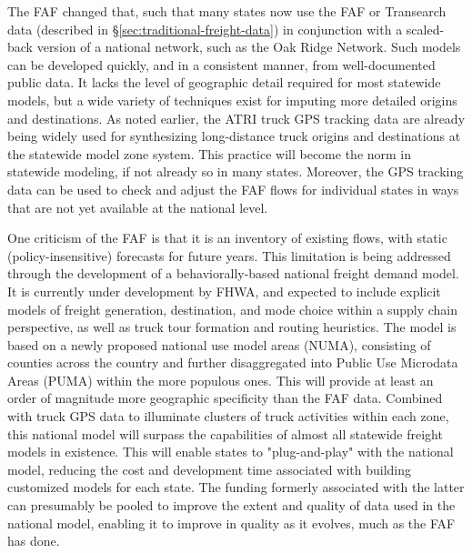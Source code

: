 The FAF changed that, such that many states now use the FAF or Transearch data (described in \S\ref{sec:traditional-freight-data}) in conjunction with a scaled-back version of a national network, such as the Oak Ridge Network. Such models can be developed quickly, and in a consistent manner, from well-documented public data. It lacks the level of geographic detail required for most statewide models, but a wide variety of techniques exist for imputing more detailed origins and destinations. As noted earlier, the ATRI truck GPS tracking data are already being widely used for synthesizing long-distance truck origins and destinations at the statewide model zone system. This practice will become the norm in statewide modeling, if not already so in many states. Moreover, the GPS tracking data can be used to check and adjust the FAF flows for individual states in ways that are not yet available at the national level.

One criticism of the FAF is that it is an inventory of existing flows, with static (policy-in\-sen\-si\-tive) forecasts for future years. This limitation is being addressed through the development of a be\-hav\-iorally-based national freight demand model. It is currently under development by FHWA, and expected to include explicit models of freight generation, destination, and mode choice within a supply chain perspective, as well as truck tour formation and routing heuristics. The model is based on a newly proposed national use model areas (NUMA), consisting of counties across the country and further disaggregated into Public Use Microdata Areas (PUMA) within the more populous ones. This will provide at least an order of magnitude more geographic specificity than the FAF data. Combined with truck GPS data to illuminate clusters of truck activities within each zone, this national model will surpass the capabilities of almost all statewide freight models in existence. This will enable states to "plug-and-play" with the national model, reducing the cost and development time associated with building customized models for each state. The funding formerly associated with the latter can presumably be pooled to improve the extent and quality of data used in the national model, enabling it to improve in quality as it evolves, much as the FAF has done.

